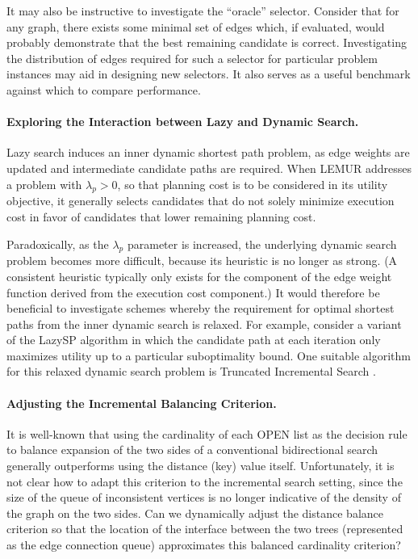 It may also be instructive to investigate the ``oracle'' selector.
Consider that for any graph,
there exists some minimal set of edges which, if evaluated,
would probably demonstrate that the best remaining candidate is
correct.
Investigating the distribution of edges required for such a selector
for particular problem instances
may aid in designing new selectors.
It also serves as a useful benchmark against which to compare performance.

\paragraph{Exploring the Interaction between Lazy and Dynamic Search.}
Lazy search induces an inner dynamic shortest path problem,
as edge weights are updated and intermediate candidate paths are
required.
When LEMUR addresses a problem with $\lambda_p > 0$,
so that planning cost is to be considered in its utility objective,
it generally selects candidates that do not solely minimize execution cost
in favor of candidates that lower remaining planning cost.

Paradoxically,
as the $\lambda_p$ parameter is increased,
the underlying dynamic search problem becomes more difficult,
because its heuristic is no longer as strong.
(A consistent heuristic typically only exists for the component of
the edge weight function derived from the execution cost component.)
It would therefore be beneficial to investigate schemes whereby
the requirement for optimal shortest paths from the inner
dynamic search is relaxed.
For example,
consider a variant of the LazySP algorithm
in which the candidate path at each iteration only maximizes utility
up to a particular suboptimality bound. 
One suitable algorithm for this relaxed dynamic search problem
is Truncated Incremental Search \citep{aine2016truncatedincremental}.

\paragraph{Adjusting the Incremental Balancing Criterion.}
It is well-known \citep{pohl1969bidirectional}
that using the cardinality of each OPEN list as the decision rule
to balance expansion of the two sides of a conventional bidirectional
search generally outperforms using the distance (key) value itself.
Unfortunately,
it is not clear how to adapt this criterion to the incremental
search setting,
since the size of the queue of inconsistent vertices is no longer
indicative of the density of the graph on the two sides.
Can we dynamically adjust the distance balance criterion
so that the location of the interface between the two trees
(represented as the edge connection queue)
approximates this balanced cardinality criterion?

